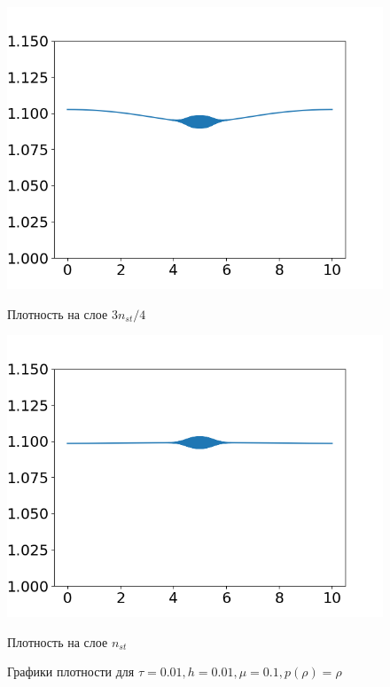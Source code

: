 \documentclass[12pt,a4paper]{article}
\begin{document}
\begin{figure}[h]
\begin{minipage}[h]{0.47\linewidth}
		\includegraphics[width=1\linewidth]{pics/task2/34h_1.png} 
		\caption{Плотность на слое $3n_{st} / 4$}
	\end{minipage}
	\hfill
	\begin{minipage}[h]{0.47\linewidth}
		\centering
		\includegraphics[width=1\linewidth]{pics/task2/44h_1.png} 
		\caption{Плотность на слое $n_{st}$}
	\end{minipage}
	\caption{Графики плотности для $\tau = 0.01, h = 0.01, \mu = 0.1, p(\rho) = \rho$}
\end{figure}
\end{document}
